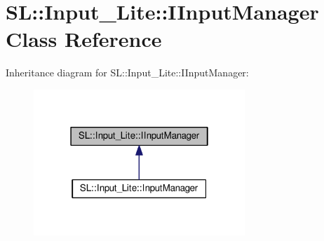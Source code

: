 \hypertarget{class_s_l_1_1_input___lite_1_1_i_input_manager}{}\section{SL\+:\+:Input\+\_\+\+Lite\+:\+:I\+Input\+Manager Class Reference}
\label{class_s_l_1_1_input___lite_1_1_i_input_manager}


Inheritance diagram for SL\+:\+:Input\+\_\+\+Lite\+:\+:I\+Input\+Manager\+:
\nopagebreak
\begin{figure}[H]
\begin{center}
\leavevmode
\includegraphics[width=226pt]{class_s_l_1_1_input___lite_1_1_i_input_manager__inherit__graph}
\end{center}
\end{figure}
